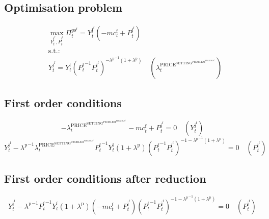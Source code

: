 \subsection{Optimisation problem}

\begin{align}
&\max_{Y^{\mathrm{j}^{\mathrm{f}}}_{t}, P^{\mathrm{j}^{\mathrm{f}}}_{t}
} \Pi^{\mathrm{ps}^{\mathrm{f}}}_{t} = {Y^{\mathrm{j}^{\mathrm{f}}}_{t}} \left(-{m\!c}^{\mathrm{f}}_{t} + P^{\mathrm{j}^{\mathrm{f}}}_{t}\right)\\
&\mathrm{s.t.:}\nonumber\\
& Y^{\mathrm{j}^{\mathrm{f}}}_{t} = {Y^{\mathrm{f}}_{t}} {\left({P^{\mathrm{f}}_{t}}^{-1} {P^{\mathrm{j}^{\mathrm{f}}}_{t}}\right)^{-{\lambda^{\mathrm{p}}}^{-1} \left(1 + \lambda^{\mathrm{p}}\right)}} \quad \left(\lambda^{\mathrm{PRICE}^{\mathrm{SETTING}^{\mathrm{PROBLEM}^{\mathrm{FLEXIBLE}^{\mathrm{1}}}}}}_{t}\right)
\end{align}


\subsection{First order conditions}

\begin{equation}
-\lambda^{\mathrm{PRICE}^{\mathrm{SETTING}^{\mathrm{PROBLEM}^{\mathrm{FLEXIBLE}^{\mathrm{1}}}}}}_{t} - {m\!c}^{\mathrm{f}}_{t} + P^{\mathrm{j}^{\mathrm{f}}}_{t} = 0
 \quad \left(Y^{\mathrm{j}^{\mathrm{f}}}_{t}\right)
\end{equation}
\begin{equation}
Y^{\mathrm{j}^{\mathrm{f}}}_{t} - {\lambda^{\mathrm{p}}}^{-1} {\lambda^{\mathrm{PRICE}^{\mathrm{SETTING}^{\mathrm{PROBLEM}^{\mathrm{FLEXIBLE}^{\mathrm{1}}}}}}_{t}} {P^{\mathrm{f}}_{t}}^{-1} {Y^{\mathrm{f}}_{t}} \left(1 + \lambda^{\mathrm{p}}\right) {\left({P^{\mathrm{f}}_{t}}^{-1} {P^{\mathrm{j}^{\mathrm{f}}}_{t}}\right)^{-1 - {\lambda^{\mathrm{p}}}^{-1} \left(1 + \lambda^{\mathrm{p}}\right)}} = 0
 \quad \left(P^{\mathrm{j}^{\mathrm{f}}}_{t}\right)
\end{equation}


\subsection{First order conditions after reduction}

\begin{equation}
Y^{\mathrm{j}^{\mathrm{f}}}_{t} - {\lambda^{\mathrm{p}}}^{-1} {P^{\mathrm{f}}_{t}}^{-1} {Y^{\mathrm{f}}_{t}} \left(1 + \lambda^{\mathrm{p}}\right) \left(-{m\!c}^{\mathrm{f}}_{t} + P^{\mathrm{j}^{\mathrm{f}}}_{t}\right) {\left({P^{\mathrm{f}}_{t}}^{-1} {P^{\mathrm{j}^{\mathrm{f}}}_{t}}\right)^{-1 - {\lambda^{\mathrm{p}}}^{-1} \left(1 + \lambda^{\mathrm{p}}\right)}} = 0
 \quad \left(P^{\mathrm{j}^{\mathrm{f}}}_{t}\right)
\end{equation}




